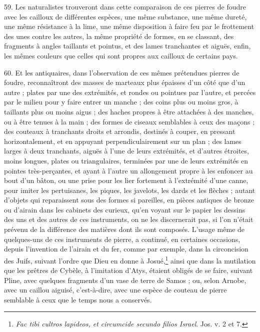 \documentclass[a4paper, 11pt, oneside, polutonikogreek, french]{article}
\begin{document}
59. Les naturalistes trouveront dans cette comparaison de ces pierres de foudre avec les cailloux de différentes espèces, une même substance, une même dureté, une même résistance à la lime, une même disposition à faire feu par le frottement des unes contre les autres, la même propriété de formes, en se classant, des fragments à angles taillants et pointus, et des lames tranchantes et aiguës, enfin, les mêmes couleurs que celles qui sont propres aux cailloux de certains pays.

60. Et les antiquaires, dans l'observation de ces mêmes prétendues pierres de foudre, reconnaîtront des masses de marteaux plus épaisses d'un côté que d'un autre ; plates par une des extrémités, et rondes ou pointues par l'autre, et percées par le milieu pour y faire entrer un manche ; des coins plus ou moins gros, à taillants plus ou moins aigus ; des haches propres à être attachées à des manches, ou à être tenues à la main ; des formes de ciseaux semblables à ceux des maçons ; des couteaux à tranchants droits et arrondis, destinés à couper, en pressant horizontalement, et en appuyant perpendiculairement sur un plan ; des lames larges à deux tranchants, aiguës à l'une de leurs extrémités, et d'autres étroites, moins longues, plates ou triangulaires, terminées par une de leurs extrémités en pointes très-perçantes, et ayant à l'autre un allongement propre à les enfoncer au bout d'un bâton, ou une prise pour les lier fortement à l'extrémité d'une canne, pour imiter les pertuisanes, les piques, les javelots, les dards et les flèches ; autant d'objets qui reparaissent sous des formes si pareilles, en pièces antiques de bronze ou d'airain dans les cabinets des curieux, qu'en voyant sur le papier les dessins des uns et des autres de ces instruments, on ne les discernerait pas, si l'on n'était prévenu de la différence des matières dont ils sont composés. L'usage même de quelques-uns de ces instruments de pierre, a continué, en certaines occasions, depuis l'invention de l'airain et du fer, comme par exemple, dans la circoncision des Juifs, suivant l'ordre que Dieu en donne à Josué,\footnote{\emph{Fac tibi cultros lapideos, et circumcide secundo filios Israel}. Jos. v. 2 et 7.} ainsi que dans la mutilation que les prêtres de Cybèle, à l'imitation d'Atys, étaient obligés de se faire, suivant Pline, avec quelques fragments d'un vase de terre de Samos ; ou, selon Arnobe, avec un caillou aiguisé, c'est-à-dire, avec une espèce de couteau de pierre semblable à ceux que le temps nous a conservés.
\end{document}
